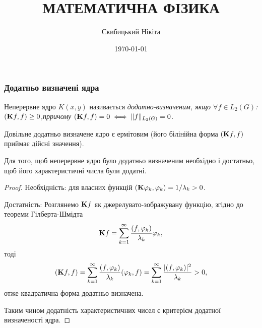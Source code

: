  

 \title{{\Huge МАТЕМАТИЧНА ФІЗИКА}}
 \author{Скибицький Нікіта}
 \date{\today}

 

 

 \tableofcontents

% 
% 
% 
% 

 \setcounter{section}{2}
 \setcounter{subsection}{4}
 \setcounter{subsubsection}{4}
 \setcounter{theorem}{15}
 \setcounter{equation}{41}

\subsubsection{Додатньо визначені ядра}

\begin{definition}
    Неперервне ядро $K(x, y)$ називається \it{додатно-визначеним}, якщо $\forall f \in L_2(G)$: $(\bf{K}f, f) \ge 0$,прричому $(\bf{K}f, f) = 0 \iff \|f\|_{L_2(G)} = 0$.
\end{definition}

\begin{remark}
    Довільне додатньо визначене ядро є ермітовим (його білінійна форма $(\bf{K}f, f)$ приймає дійсні значення).
\end{remark}

\begin{lemma}
    Для того, щоб неперервне ядро було додатньо визначеним необхідно і достатньо, щоб його характеристичні числа були додатні.
\end{lemma}

\begin{proof}
    Необхідність: для власних функцій $(\bf{K} \phi_k, \phi_k) = 1 / \lambda_k > 0$. \medskip

    Достатність: Розглянемо $\bf{K} f$ як джерелувато-зображувану функцію, згідно до теореми Гілберта-Шмідта
    \begin{equation}
        \bf{K} f = \sum_{k = 1}^\infty \frac{(f, \phi_k)}{\lambda_k} \phi_k,
    \end{equation}
    тоді 
    \begin{equation}
        (\bf{K}f, f) = \Sum_{k = 1}^\infty \dfrac{(f, \phi_k)}{\lambda_k} (\phi_k, f) = \Sum_{k = 1}^\infty \dfrac{|(f, \phi_k)|^2}{\lambda_k} > 0,
    \end{equation}
    отже квадратична форма додатньо визначена. \medskip

    Таким чином додатність характеристичних чисел є критерієм додатної визначеності ядра.
\end{proof}


